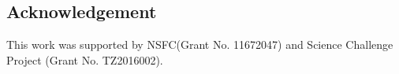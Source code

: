 \documentclass[review]{elsarticle}
\begin{document}
\begin{enumerate}[Step 1]
\section*{Acknowledgement}
This work was supported by NSFC(Grant No. 11672047) and Science Challenge Project (Grant No. TZ2016002).


%

\end{enumerate}
\end{document}
